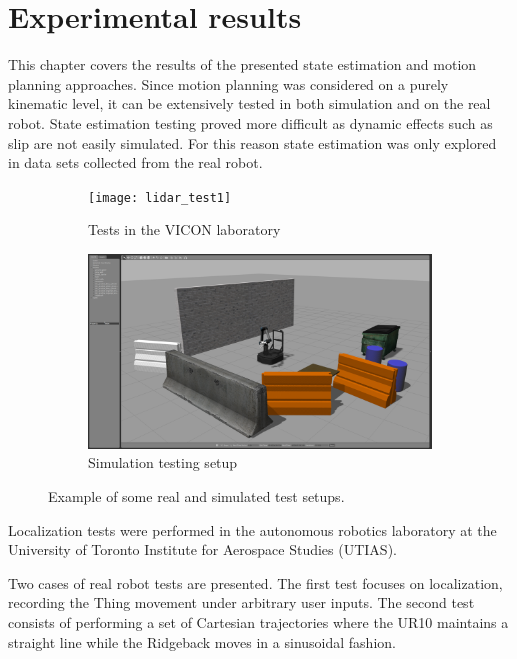 \documentclass[times, utf8, diplomski, english]{fer}
\begin{document}
\chapter{Experimental results}
This chapter covers the results of the presented state estimation and motion planning approaches.
Since motion planning was considered on a purely kinematic level, it can be extensively tested in both simulation and on the real robot.
State estimation testing proved more difficult as dynamic effects such as slip are not easily simulated.
For this reason state estimation was only explored in data sets collected from the real robot.
\begin{figure}[h]
    \centering
    \begin{subfigure}[t]{0.45\textwidth}
        \texttt{[image: lidar\_test1]}
        \caption{Tests in the VICON laboratory}
        \label{figure:VICONtest}
    \end{subfigure}
    \begin{subfigure}[t]{0.45\textwidth}
        \includegraphics[trim={25cm 2.5cm 10cm 8cm},clip,width=\textwidth]{gazebo_screenshot1}
        \caption{Simulation testing setup}
        \label{figure:simulationtest}
    \end{subfigure}
    \caption{Example of some real and simulated test setups.}\label{fig:resultsphotos}
\end{figure}
Localization tests were performed in the autonomous robotics laboratory at the University of Toronto Institute for Aerospace Studies (UTIAS).

Two cases of real robot tests are presented.
The first test focuses on localization, recording the Thing movement under arbitrary user inputs.
The second test consists of performing a set of Cartesian trajectories where the UR10 maintains a straight line while the Ridgeback moves in a sinusoidal fashion.
\end{document}
